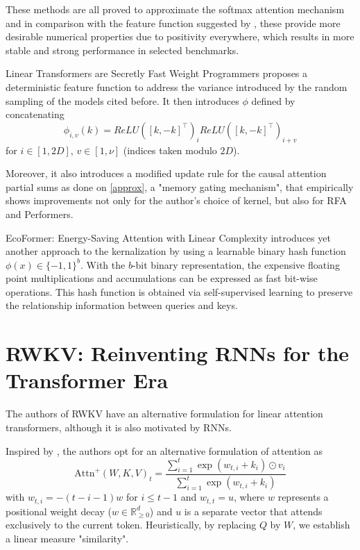 These methods are all proved to approximate the softmax attention mechanism and in comparison with the feature function suggested by \cite{peng2021random}, these provide more desirable numerical properties due to positivity everywhere, which results in more stable and strong performance in selected benchmarks.

\vspace{1em}

Linear Transformers are Secretly Fast Weight Programmers \cite{schlag2021linear} proposes a deterministic feature function to address the variance introduced by the random sampling of the models cited before. It then introduces $\phi$ defined by concatenating \begin{equation}\label{FWP}\phi_{i, v}(k) = ReLU([k, -k]^\top)_i ReLU([k, -k]^\top)_{i + v}\end{equation} for $i \in [1, 2D]$, $v \in [1, \nu]$ (indices taken modulo $2D$).

Moreover, it also introduces a modified update rule for the causal attention partial sums as done on \ref{approx}, a "memory gating mechanism", that empirically shows improvements not only for the author's choice of kernel, but also for RFA\cite{peng2021random} and Performers\cite{choromanski2022rethinking}.

\vspace{1em}
EcoFormer: Energy-Saving Attention with Linear Complexity \cite{liu2023ecoformer} introduces yet another approach to the kernalization by using a learnable binary hash function $\phi(x) \in \{-1, 1\}^b$. With the $b$-bit binary representation, the expensive floating point multiplications and accumulations can be expressed as fast bit-wise operations. This hash function is obtained via self-supervised learning to preserve the relationship information between queries and keys.

\section{RWKV: Reinventing RNNs for the Transformer Era \cite{Peng2023}}

The authors of RWKV have an alternative formulation for linear attention transformers, although it is also motivated by RNNs.

Inspired by \cite{Zhai2021}, the authors opt for an alternative formulation of attention as
$$
    \text{Attn}^+ (W, K, V)_t = \frac{\sum_{i=1}^t \exp(w_{t, i} + k_i) \odot v_i}{\sum_{i=1}^t \exp(w_{t, i} + k_i)}
$$
with $w_{t, i} = -(t - i - 1)w$ for $i \leq t - 1$ and $w_{t, t} = u$, where $w$ represents a positional weight decay ($w \in \mathbb{R}_{\geq 0}^d$) and $u$ is a separate vector that attends exclusively to the current token. Heuristically, by replacing $Q$ by $W$, we establish a linear measure "similarity".

